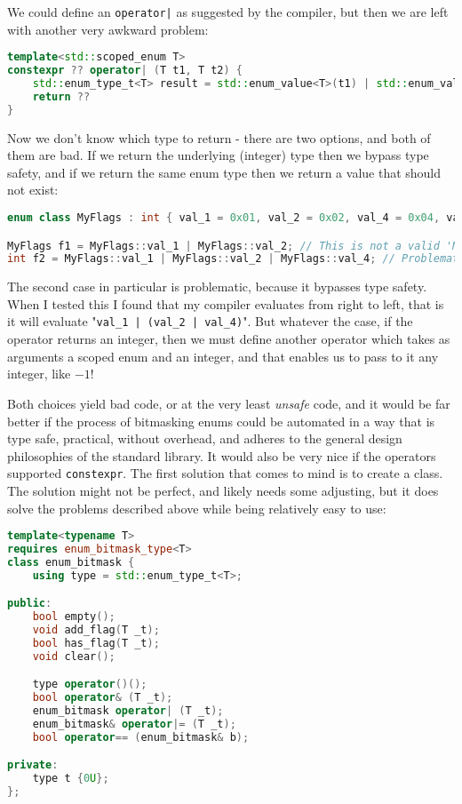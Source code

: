 \documentclass[
  format=manuscript,
  screen=true,
  review=false,
  nonacm=true,
  timestamp=true,
  balance=false]{acmart}
\newcommand{\beforecodespace}{\vspace{4mm}}
\begin{document}
We could define an \texttt{operator|} as suggested by the compiler, but then we are
left with another very awkward problem:

\beforecodespace\begin{lstlisting}[language=Cpp]
template<std::scoped_enum T>
constexpr ?? operator| (T t1, T t2) {
    std::enum_type_t<T> result = std::enum_value<T>(t1) | std::enum_value<T>(t2);
    return ??
}
\end{lstlisting}

\noindent
Now we don't know which type to return - there are two options, and both of them are
bad. If we return the underlying (integer) type then we bypass type safety, and if
we return the same enum type then we return a value that should not exist:

\beforecodespace\begin{lstlisting}[language=Cpp]
enum class MyFlags : int { val_1 = 0x01, val_2 = 0x02, val_4 = 0x04, val_8 = 0x08 };

MyFlags f1 = MyFlags::val_1 | MyFlags::val_2; // This is not a valid 'MyFlags' !
int f2 = MyFlags::val_1 | MyFlags::val_2 | MyFlags::val_4; // Problematic!
\end{lstlisting}

The second case in particular is problematic, because it bypasses type safety.
When I tested this I found that my compiler evaluates from right to left, that is
it will evaluate "\texttt{val\_1 | (val\_2 | val\_4)}". But whatever the case, if
the operator returns an integer, then we must define another operator which takes
as arguments a scoped enum and an integer, and that enables us to pass to it any
integer, like $-1$!

\noindent
Both choices yield bad code, or at the very least \textit{unsafe} code, and it would
be far better if the process of bitmasking enums could be automated in a way that
is type safe, practical, without overhead, and adheres to the general design
philosophies of the standard library. It would also be very nice if the operators
supported \texttt{constexpr}. The first solution that comes to mind is to create
a class. The solution might not be perfect, and likely needs some adjusting, but
it does solve the problems described above while being relatively easy to use:

\beforecodespace\begin{lstlisting}[language=Cpp]
template<typename T>
requires enum_bitmask_type<T>
class enum_bitmask {
    using type = std::enum_type_t<T>;

public:
    bool empty();
    void add_flag(T _t);
    bool has_flag(T _t);
    void clear();

    type operator()();
    bool operator& (T _t);
    enum_bitmask operator| (T _t);
    enum_bitmask& operator|= (T _t);
    bool operator== (enum_bitmask& b);

private:
    type t {0U};
};
\end{lstlisting}
\end{document}
